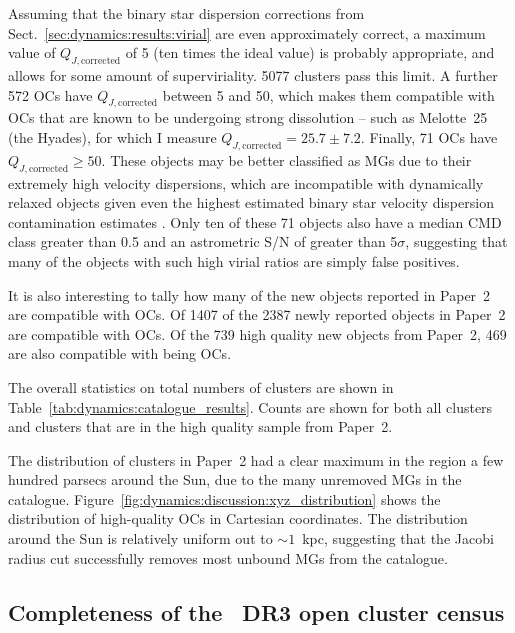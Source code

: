 Assuming that the binary star dispersion corrections from Sect.~\ref{sec:dynamics:results:virial} are even approximately correct, a maximum value of $Q_{J,\text{corrected}}$ of 5 (ten times the ideal value) is probably appropriate, and allows for some amount of superviriality. 5077 clusters pass this limit. A further 572 OCs have $Q_{J,\text{corrected}}$ between 5 and 50, which makes them compatible with OCs that are known to be undergoing strong dissolution -- such as Melotte~25 (the Hyades), for which I measure $Q_{J,\text{corrected}}=25.7 \pm 7.2$. Finally, 71 OCs have $Q_{J,\text{corrected}}\geq50$. These objects may be better classified as MGs due to their extremely high velocity dispersions, which are incompatible with dynamically relaxed objects given even the highest estimated binary star velocity dispersion contamination estimates \citep{rastello_effect_binarity_2020}. Only ten of these 71 objects also have a median CMD class greater than 0.5 and an astrometric S/N of greater than 5$\sigma$, suggesting that many of the objects with such high virial ratios are simply false positives.

It is also interesting to tally how many of the new objects reported in Paper~2 are compatible with OCs. Of 1407 of the 2387 newly reported objects in Paper~2 are compatible with OCs. Of the 739 high quality new objects from Paper~2, 469 are also compatible with being OCs.

The overall statistics on total numbers of clusters are shown in Table~\ref{tab:dynamics:catalogue_results}. Counts are shown for both all clusters and clusters that are in the high quality sample from Paper~2.

The distribution of clusters in Paper~2 had a clear maximum in the region a few hundred parsecs around the Sun, due to the many unremoved MGs in the catalogue. Figure~\ref{fig:dynamics:discussion:xyz_distribution} shows the distribution of high-quality OCs in Cartesian coordinates. The distribution around the Sun is relatively uniform out to $\sim1$~kpc, suggesting that the Jacobi radius cut successfully removes most unbound MGs from the catalogue.


\subsection{Completeness of the \gaia\ DR3 open cluster census}
\label{sec:dynamics:results:completeness}

